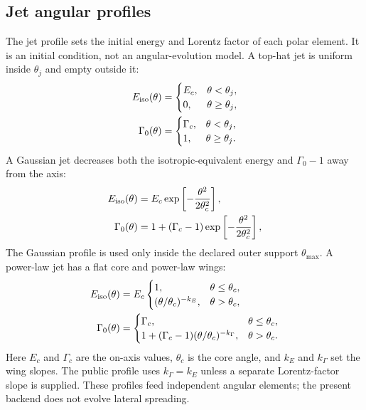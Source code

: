 \documentclass[twocolumn]{aastex702}
\begin{document}
\subsection{Jet angular profiles}

The jet profile sets the initial energy and Lorentz factor of each polar
element.  It is an initial condition, not an angular-evolution model.  A top-hat
jet is uniform inside \(\theta_j\) and empty outside it:
\begin{equation}
\begin{aligned}
E_{\rm iso}(\theta) &=
\begin{cases}
E_c, & \theta<\theta_j,\\
0, & \theta\ge\theta_j,
\end{cases}\\
\Gamma_0(\theta) &=
\begin{cases}
\Gamma_c, & \theta<\theta_j,\\
1, & \theta\ge\theta_j .
\end{cases}
\end{aligned}
\end{equation}
A Gaussian jet decreases both the isotropic-equivalent energy and
\(\Gamma_0-1\) away from the axis:
\begin{equation}
\begin{aligned}
E_{\rm iso}(\theta) &=
E_c\exp\left[-\frac{\theta^2}{2\theta_c^2}\right],\\
\Gamma_0(\theta) &=
1+(\Gamma_c-1)\exp\left[-\frac{\theta^2}{2\theta_c^2}\right],
\end{aligned}
\end{equation}
The Gaussian profile is used only inside the declared outer support
\(\theta_{\max}\).  A power-law jet has a flat core and power-law wings:
\begin{equation}
\begin{aligned}
E_{\rm iso}(\theta) &=
E_c
\begin{cases}
1, & \theta\le \theta_c,\\
(\theta/\theta_c)^{-k_E}, & \theta>\theta_c,
\end{cases}\\
\Gamma_0(\theta) &=
\begin{cases}
\Gamma_c, & \theta\le \theta_c,\\
1+(\Gamma_c-1)(\theta/\theta_c)^{-k_\Gamma}, & \theta>\theta_c .
\end{cases}
\end{aligned}
\end{equation}
Here \(E_c\) and \(\Gamma_c\) are the on-axis values, \(\theta_c\) is the core
angle, and \(k_E\) and \(k_\Gamma\) set the wing slopes.  The public profile uses
\(k_\Gamma=k_E\) unless a separate Lorentz-factor slope is supplied.  These
profiles feed independent angular elements; the present backend does not evolve
lateral spreading.
\end{document}
